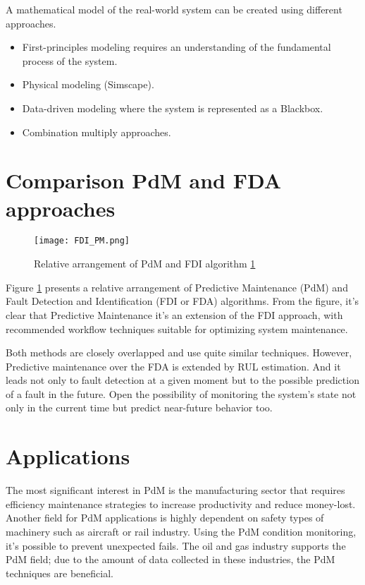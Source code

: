 A mathematical model of the real-world system can be created using different approaches. 
\begin{itemize}
    \item First-principles modeling requires an understanding of the fundamental process of the system.
    \item Physical modeling (Simscape).
    \item Data-driven modeling where the system is represented as a Blackbox.
    \item Combination multiply approaches.
\end{itemize}

\section{Comparison PdM and FDA approaches}

\begin{figure}[h!]
    \centering
    \texttt{[image: FDI\_PM.png]}
    \caption{Relative arrangement of PdM and FDI algorithm \ref{}}
    \label{fig:fdi_pm}
\end{figure}

Figure \ref{fig:fdi_pm} presents a relative arrangement of Predictive Maintenance (PdM)
and Fault Detection and Identification (FDI or FDA) algorithms. From the
figure, it's clear that Predictive Maintenance it's an extension of the FDI
approach, with recommended workflow techniques suitable for optimizing
system maintenance. 

Both methods are closely overlapped and use quite
similar techniques. However, Predictive maintenance over the FDA is
extended by RUL estimation. And it leads not only to fault detection at a
given moment but to the possible prediction of a fault in the future. Open
the possibility of monitoring the system's state not only in the current
time but predict near-future behavior too.

\section{Applications}\label{sec:applications}

The most significant interest in PdM is the manufacturing sector that
requires efficiency maintenance strategies to increase productivity and
reduce money-lost.  Another field for PdM applications is highly dependent
on safety types of machinery such as aircraft or rail industry.  Using the
PdM condition monitoring, it's possible to prevent unexpected fails. The
oil and gas industry supports the PdM field; due to the amount of data
collected in these industries, the PdM techniques are beneficial.
